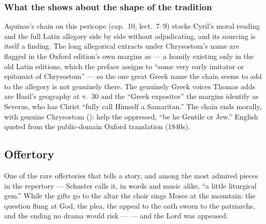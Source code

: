 \subsubsection*{What the  shows about the shape of the tradition}

Aquinas's chain on this pericope (cap.~10, lect.~7--9) stacks Cyril's moral
reading and the full Latin allegory side by side without adjudicating, and
its sourcing is itself a finding. The long allegorical extracts under
Chrysostom's name are flagged in the Oxford edition's own margins as
 --- a homily existing only in the old Latin
editions, which the preface assigns to ``some very early imitator or
epitomist of Chrysostom'' --- so the one great Greek name the chain seems to
add to the allegory is not genuinely there. The genuinely Greek voices Thomas
adds are Basil's geography at v.~30 and the ``Greek expositor'' the margins
identify as Severus, who has Christ ``fully call Himself a Samaritan.'' The
chain ends morally, with genuine Chrysostom ():
help the oppressed, ``be he Gentile or Jew.'' English quoted from the
public-domain Oxford translation (1840s).

\elementguard
\subsection*{Offertory }


One of the rare offertories that tells a story, and among the most admired
pieces in the repertory --- Schuster calls it, in words and music alike, ``a
little liturgical gem.'' While the gifts go to the altar the choir sings
Moses at the mountain: the question flung at God, the plea, the appeal to the
oath sworn to the patriarchs, and the ending no drama would risk ---  --- and the Lord was appeased.

